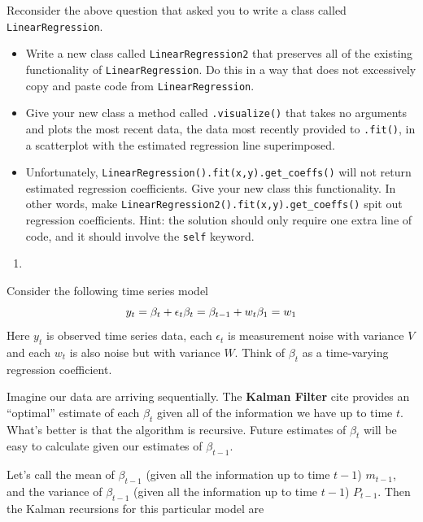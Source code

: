 \documentclass[
  12pt,
  krantz2]{krantz}
\providecommand{\tightlist}{%
  \setlength{\itemsep}{0pt}\setlength{\parskip}{0pt}}
\begin{document}
Reconsider the above question that asked you to write a class called \texttt{LinearRegression}.

\begin{itemize}
\tightlist
\item
  Write a new class called \texttt{LinearRegression2} that preserves all of the existing functionality of \texttt{LinearRegression}. Do this in a way that does not excessively copy and paste code from \texttt{LinearRegression}.
\item
  Give your new class a method called \texttt{.visualize()} that takes no arguments and plots the most recent data, the data most recently provided to \texttt{.fit()}, in a scatterplot with the estimated regression line superimposed.
\item
  Unfortunately, \texttt{LinearRegression().fit(x,y).get\_coeffs()} will not return estimated regression coefficients. Give your new class this functionality. In other words, make \texttt{LinearRegression2().fit(x,y).get\_coeffs()} spit out regression coefficients. Hint: the solution should only require one extra line of code, and it should involve the \texttt{self} keyword.
\end{itemize}

\begin{enumerate}
\def\labelenumi{\arabic{enumi}.}
\setcounter{enumi}{2}
\tightlist
\item
\end{enumerate}

Consider the following time series model \citep{West1989BayesianFA}
\begin{equation} 
y_t = \beta_t + \epsilon_t \\
\beta_t = \beta_{t-1} + w_t \\
\beta_1 = w_1
\end{equation}
Here \(y_t\) is observed time series data, each \(\epsilon_t\) is measurement noise with variance \(V\) and each \(w_t\) is also noise but with variance \(W\). Think of \(\beta_t\) as a time-varying regression coefficient.

Imagine our data are arriving sequentially. The \textbf{Kalman Filter} \citep{kalman_filt} cite provides an ``optimal'' estimate of each \(\beta_t\) given all of the information we have up to time \(t\). What's better is that the algorithm is recursive. Future estimates of \(\beta_t\) will be easy to calculate given our estimates of \(\beta_{t-1}\).

Let's call the mean of \(\beta_{t-1}\) (given all the information up to time \(t-1\)) \(m_{t-1}\), and the variance of \(\beta_{t-1}\) (given all the information up to time \(t-1\)) \(P_{t-1}\). Then the Kalman recursions for this particular model are
\end{document}
